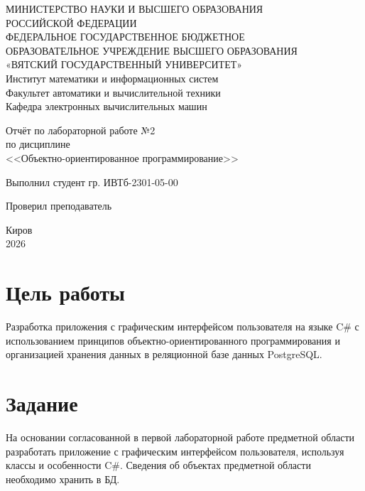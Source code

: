 \documentclass[oneside,a4paper,14pt]{extarticle}
\begin{document}
\newpage\thispagestyle{empty}
\begin{center}
	МИНИСТЕРСТВО НАУКИ И ВЫСШЕГО ОБРАЗОВАНИЯ\\
	РОССИЙСКОЙ ФЕДЕРАЦИИ\\
	ФЕДЕРАЛЬНОЕ ГОСУДАРСТВЕННОЕ БЮДЖЕТНОЕ\\
	ОБРАЗОВАТЕЛЬНОЕ УЧРЕЖДЕНИЕ ВЫСШЕГО ОБРАЗОВАНИЯ\\
	«ВЯТСКИЙ ГОСУДАРСТВЕННЫЙ УНИВЕРСИТЕТ»\\
	Институт математики и информационных систем\\
	Факультет автоматики и вычислительной техники\\
	Кафедра электронных вычислительных машин
\end{center}

\vspace{20mm}
\begin{center}

	Отчёт по лабораторной работе №2\\
	по дисциплине\\
	<<Объектно-ориентированное программирование>>\\
\end{center}
\vfill

Выполнил студент гр. ИВТб-2301-05-00 \hfill
{}

Проверил преподаватель\hfill
{}

\vfill
\begin{center}
	Киров\\
	2026
\end{center}

\newpage
\setcounter{page}{1}
\tableofcontents
\newpage

\section*{Цель работы}
Разработка приложения с графическим интерфейсом пользователя на языке C\# с использованием принципов объектно-ориентированного программирования и организацией хранения данных в реляционной базе данных PostgreSQL.

\section*{Задание}

На основании согласованной в первой лабораторной работе предметной области разработать приложение с графическим интерфейсом пользователя, используя классы и особенности C\#. Сведения об объектах предметной области необходимо хранить в БД.
\end{document}
